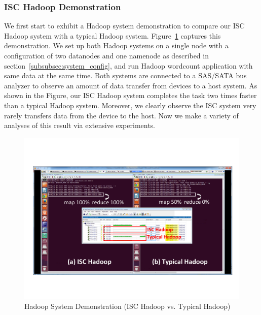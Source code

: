 \subsubsection{ISC Hadoop Demonstration}\label{subsubsec:ISC_demo}
We first start to exhibit a Hadoop system demonstration to compare our ISC Hadoop system with a typical Hadoop system. Figure~\ref{fig:ISC_Hadoop_demo} captures this demonstration. We set up both Hadoop systems on a single node with a configuration of two datanodes and one namenode as described in section~\ref{subsubsec:system_config}, and run Hadoop wordcount application with same data at the same time. Both systems are connected to a SAS/SATA bus analyzer to observe an amount of data transfer from devices to a host system. As shown in the Figure, our ISC Hadoop system completes the task two times faster than a typical Hadoop system. Moreover, we clearly observe the ISC system very rarely transfers data from the device to the host.
Now we make a variety of analyses of this result via extensive experiments.


\begin{figure}[htbp]
	\centering
		\includegraphics[width=1.0\columnwidth]{figures/ISC_Hadoop_demo.pdf}
	\caption{Hadoop System Demonstration (ISC Hadoop vs. Typical Hadoop)}
	\label{fig:ISC_Hadoop_demo}
\end{figure}







